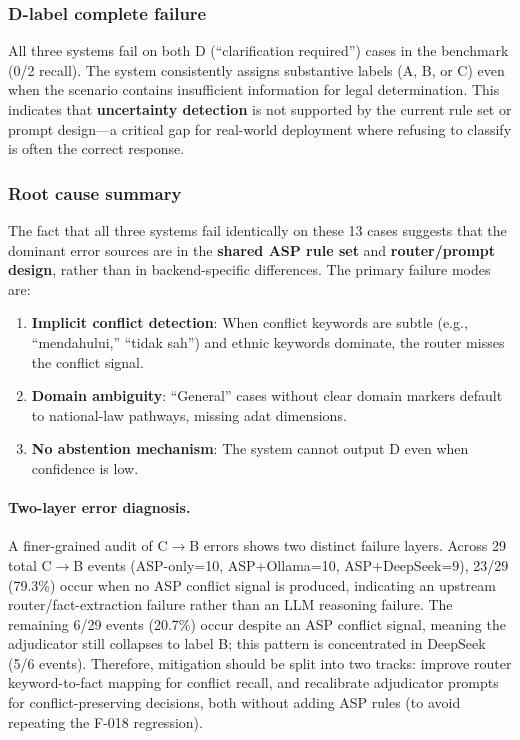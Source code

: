 \documentclass[11pt]{article}
\begin{document}
\subsubsection{D-label complete failure}

All three systems fail on both D (``clarification required'') cases in the benchmark (0/2 recall). The system consistently assigns substantive labels (A, B, or C) even when the scenario contains insufficient information for legal determination. This indicates that \textbf{uncertainty detection} is not supported by the current rule set or prompt design---a critical gap for real-world deployment where refusing to classify is often the correct response.

\subsubsection{Root cause summary}

The fact that all three systems fail identically on these 13 cases suggests that the dominant error sources are in the \textbf{shared ASP rule set} and \textbf{router/prompt design}, rather than in backend-specific differences. The primary failure modes are:
\begin{enumerate}[nosep]
  \item \textbf{Implicit conflict detection}: When conflict keywords are subtle (e.g., ``mendahului,'' ``tidak sah'') and ethnic keywords dominate, the router misses the conflict signal.
  \item \textbf{Domain ambiguity}: ``General'' cases without clear domain markers default to national-law pathways, missing adat dimensions.
  \item \textbf{No abstention mechanism}: The system cannot output D even when confidence is low.
\end{enumerate}

\paragraph{Two-layer error diagnosis.}
A finer-grained audit of C$\rightarrow$B errors shows two distinct failure layers. Across 29 total C$\rightarrow$B events (ASP-only=10, ASP+Ollama=10, ASP+DeepSeek=9), 23/29 (79.3\%) occur when no ASP conflict signal is produced, indicating an upstream router/fact-extraction failure rather than an LLM reasoning failure. The remaining 6/29 events (20.7\%) occur despite an ASP conflict signal, meaning the adjudicator still collapses to label B; this pattern is concentrated in DeepSeek (5/6 events). Therefore, mitigation should be split into two tracks: improve router keyword-to-fact mapping for conflict recall, and recalibrate adjudicator prompts for conflict-preserving decisions, both without adding ASP rules (to avoid repeating the F-018 regression).
\end{document}
